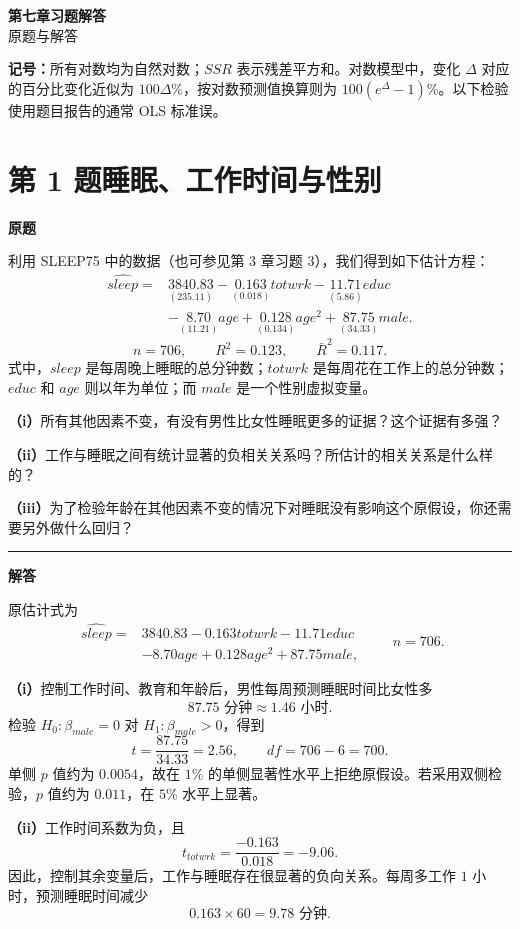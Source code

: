 \documentclass[UTF8,a4paper,11pt,fontset=fandol]{ctexart}
\newcommand{\vr}[1]{\mathit{#1}}
\newcommand{\subq}[1]{\par\medskip\noindent\textbf{（#1）}\enspace}
\newcommand{\question}[2]{\def\currentquestiontitle{第 #1 题\quad #2}}
\newcommand{\coef}[2]{\underset{\scriptstyle(#2)}{#1}}
\newenvironment{originalquestion}{%
  \par\medskip\noindent\begin{minipage}{\linewidth}
  \section*{\currentquestiontitle}
  \par\smallskip\noindent\textbf{原题}\par\smallskip
  \begingroup\small\setlength{\parskip}{2.5pt}%
}{%
  \par\endgroup\end{minipage}\par\medskip\Needspace{6\baselineskip}
  \noindent\rule{\linewidth}{0.35pt}\par\smallskip
  \noindent\textbf{解答}\par
}
\begin{document}
\begin{center}
{\LARGE\bfseries 第七章习题解答}\\[5pt]
{\small 原题与解答}
\end{center}
\vspace{3pt}
\noindent\textbf{记号：}所有对数均为自然对数；$SSR$ 表示残差平方和。对数模型中，变化 $\Delta$ 对应的百分比变化近似为 $100\Delta\%$，按对数预测值换算则为 $100(e^\Delta-1)\%$。以下检验使用题目报告的通常 OLS 标准误。

\question{1}{睡眠、工作时间与性别}
\begin{originalquestion}
利用 SLEEP75 中的数据（也可参见第 3 章习题 3），我们得到如下估计方程：
\[
\begin{aligned}
\widehat{\vr{sleep}}={}&\coef{3840.83}{235.11}
-\coef{0.163}{0.018}\vr{totwrk}
-\coef{11.71}{5.86}\vr{educ}\\
&-\coef{8.70}{11.21}\vr{age}
+\coef{0.128}{0.134}\vr{age}^2
+\coef{87.75}{34.33}\vr{male}.
\end{aligned}
\]
\[
n=706,\qquad R^2=0.123,\qquad \bar R^2=0.117.
\]
式中，$\vr{sleep}$ 是每周晚上睡眠的总分钟数；$\vr{totwrk}$ 是每周花在工作上的总分钟数；$\vr{educ}$ 和 $\vr{age}$ 则以年为单位；而 $\vr{male}$ 是一个性别虚拟变量。

\subq{i}所有其他因素不变，有没有男性比女性睡眠更多的证据？这个证据有多强？

\subq{ii}工作与睡眠之间有统计显著的负相关关系吗？所估计的相关关系是什么样的？

\subq{iii}为了检验年龄在其他因素不变的情况下对睡眠没有影响这个原假设，你还需要另外做什么回归？
\end{originalquestion}

原估计式为
\[
\begin{aligned}
\widehat{\vr{sleep}}={}&3840.83-0.163\vr{totwrk}-11.71\vr{educ}\\
&-8.70\vr{age}+0.128\vr{age}^2+87.75\vr{male},
\end{aligned}
\qquad n=706.
\]
\subq{i}控制工作时间、教育和年龄后，男性每周预测睡眠时间比女性多
\[
87.75\text{ 分钟}\approx1.46\text{ 小时}.
\]
检验 $H_0:\beta_{\vr{male}}=0$ 对 $H_1:\beta_{\vr{male}}>0$，得到
\[
t=\frac{87.75}{34.33}=2.56,\qquad df=706-6=700.
\]
单侧 $p$ 值约为 $0.0054$，故在 $1\%$ 的单侧显著性水平上拒绝原假设。若采用双侧检验，$p$ 值约为 $0.011$，在 $5\%$ 水平上显著。

\subq{ii}工作时间系数为负，且
\[
t_{\vr{totwrk}}=\frac{-0.163}{0.018}=-9.06.
\]
因此，控制其余变量后，工作与睡眠存在很显著的负向关系。每周多工作 $1$ 小时，预测睡眠时间减少
\[
0.163\times60=9.78\text{ 分钟}.
\]
\end{document}
